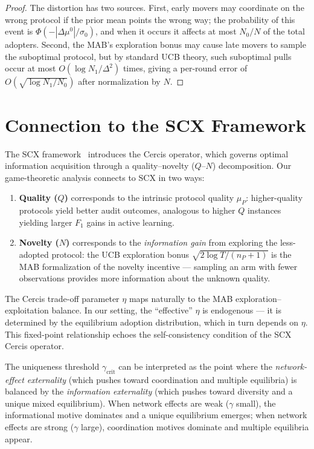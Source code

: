 \documentclass[12pt,a4paper]{article}
\begin{document}
\begin{proof}
The distortion has two sources.  First, early movers may coordinate on the
wrong protocol if the prior mean points the wrong way; the probability of
this event is $\Phi(-|\Delta\mu^0|/\sigma_0)$, and when it occurs it
affects at most $N_0/N$ of the total adopters.  Second, the MAB's
exploration bonus may cause late movers to sample the suboptimal protocol,
but by standard UCB theory, such suboptimal pulls occur at most
$O(\log N_1/\Delta^2)$ times, giving a per-round error of
$O(\sqrt{\log N_1/N_0})$ after normalization by $N$.
\end{proof}

\section{Connection to the SCX Framework}

The SCX framework~\citep{scx2024cercis} introduces the Cercis operator,
which governs optimal information acquisition through a
quality--novelty ($Q$--$N$) decomposition.  Our game-theoretic analysis
connects to SCX in two ways:

\begin{enumerate}[label=(\roman*)]
    \item \textbf{Quality ($Q$)} corresponds to the intrinsic protocol
          quality $\mu_P$: higher-quality protocols yield better audit
          outcomes, analogous to higher $Q$ instances yielding larger $F_1$
          gains in active learning.
    \item \textbf{Novelty ($N$)} corresponds to the \emph{information gain}
          from exploring the less-adopted protocol: the UCB exploration
          bonus $\sqrt{2\log T/(n_P+1)}$ is the MAB formalization of the
          novelty incentive — sampling an arm with fewer observations
          provides more information about the unknown quality.
\end{enumerate}

The Cercis trade-off parameter $\eta$ maps naturally to the MAB
exploration--exploitation balance.  In our setting, the ``effective''
$\eta$ is endogenous — it is determined by the equilibrium adoption
distribution, which in turn depends on $\eta$.  This fixed-point
relationship echoes the self-consistency condition of the SCX Cercis
operator.

\medskip\noindent
The uniqueness threshold $\gamma_{\text{crit}}$ can be interpreted as the
point where the \emph{network-effect externality} (which pushes toward
coordination and multiple equilibria) is balanced by the
\emph{information externality} (which pushes toward diversity and a unique
mixed equilibrium).  When network effects are weak ($\gamma$ small), the
informational motive dominates and a unique equilibrium emerges;
when network effects are strong ($\gamma$ large), coordination motives
dominate and multiple equilibria appear.
\end{document}
